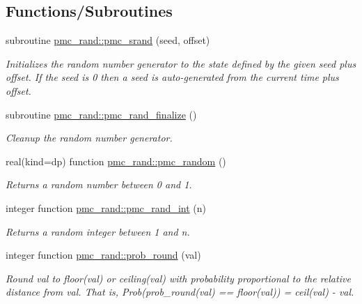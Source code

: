 \subsection*{Functions/\+Subroutines}
\begin{DoxyCompactItemize}
\item 
subroutine \mbox{\hyperlink{namespacepmc__rand_a40da4da741045a9a9ee1ac71aaa17733}{pmc\+\_\+rand\+::pmc\+\_\+srand}} (seed, offset)
\begin{DoxyCompactList}\small\item\em Initializes the random number generator to the state defined by the given seed plus offset. If the seed is 0 then a seed is auto-\/generated from the current time plus offset. \end{DoxyCompactList}\item 
subroutine \mbox{\hyperlink{namespacepmc__rand_a48ab8c38095e258be9faafc7bd59ee35}{pmc\+\_\+rand\+::pmc\+\_\+rand\+\_\+finalize}} ()
\begin{DoxyCompactList}\small\item\em Cleanup the random number generator. \end{DoxyCompactList}\item 
real(kind=dp) function \mbox{\hyperlink{namespacepmc__rand_ac30aa8df3ca962ead17d9adcaceb7263}{pmc\+\_\+rand\+::pmc\+\_\+random}} ()
\begin{DoxyCompactList}\small\item\em Returns a random number between 0 and 1. \end{DoxyCompactList}\item 
integer function \mbox{\hyperlink{namespacepmc__rand_afe2e7274c4b89e11909e08b1b1fd0e60}{pmc\+\_\+rand\+::pmc\+\_\+rand\+\_\+int}} (n)
\begin{DoxyCompactList}\small\item\em Returns a random integer between 1 and n. \end{DoxyCompactList}\item 
integer function \mbox{\hyperlink{namespacepmc__rand_aa92bb8693f9b8ef18c9e4ec820ada63b}{pmc\+\_\+rand\+::prob\+\_\+round}} (val)
\begin{DoxyCompactList}\small\item\em Round val to {\ttfamily floor(val)} or {\ttfamily ceiling(val)} with probability proportional to the relative distance from {\ttfamily val}. That is, Prob(prob\+\_\+round(val) == floor(val)) = ceil(val) -\/ val. \end{DoxyCompactList}\item 

\end{DoxyCompactItemize}
